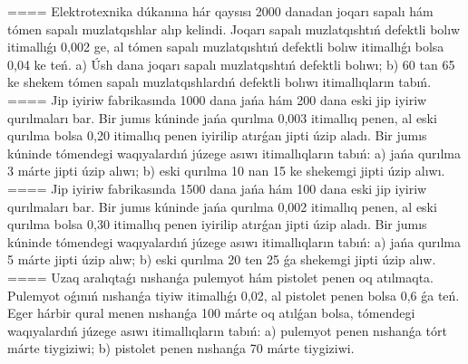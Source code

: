 ====
Elektrotexnika dúkanına hár qaysısı 2000 danadan joqarı sapalı hám tómen sapalı muzlatqıshlar alıp kelindi. Joqarı sapalı muzlatqıshtıń defektli bolıw itimallıǵı 0,002 ge, al tómen sapalı muzlatqıshtıń defektli bolıw itimallıǵı bolsa 0,04 ke teń. a) Úsh dana joqarı sapalı muzlatqıshtıń defektli bolıwı; b) 60 tan 65 ke shekem tómen sapalı muzlatqıshlardıń defektli bolıwı itimallıqların tabıń.
====
Jip iyiriw fabrikasında 1000 dana jańa hám 200 dana eski jip iyiriw qurılmaları bar. Bir jumıs kúninde jańa qurılma 0,003 itimallıq penen, al eski qurılma bolsa 0,20 itimallıq penen iyirilip atırǵan jipti úzip aladı. Bir jumıs kúninde tómendegi waqıyalardıń júzege asıwı itimallıqların tabıń: a) jańa qurılma 3 márte jipti úzip alıwı; b) eski qurılma 10 nan 15 ke shekemgi jipti úzip alıwı. 
====
Jip iyiriw fabrikasında 1500 dana jańa hám 100 dana eski jip iyiriw qurılmaları bar. Bir jumıs kúninde jańa qurılma 0,002 itimallıq penen, al eski qurılma bolsa 0,30 itimallıq penen iyirilip atırǵan jipti úzip aladı. Bir jumıs kúninde tómendegi waqıyalardıń júzege asıwı itimallıqların tabıń: a) jańa qurılma 5 márte jipti úzip alıw; b) eski qurılma 20 ten 25 ǵa shekemgi jipti úzip alıw. 
====
Uzaq aralıqtaǵı nıshanǵa pulemyot hám pistolet penen oq atılmaqta. Pulemyot oǵınıń nıshanǵa tiyiw itimallıǵı 0,02, al pistolet penen bolsa 0,6 ǵa teń. Eger hárbir qural menen nıshanǵa 100 márte oq atılǵan bolsa, tómendegi waqıyalardıń júzege asıwı itimallıqların tabıń: a) pulemyot penen nıshanǵa tórt márte tiygiziwi; b) pistolet penen nıshanǵa 70 márte tiygiziwi.